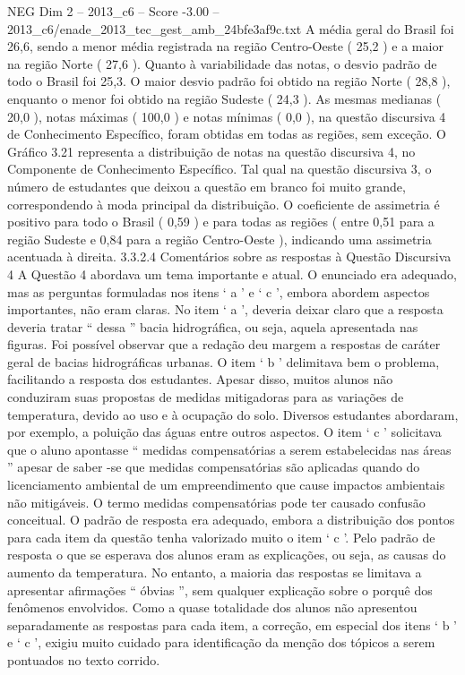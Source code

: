 \begin{textsample}{NEG Dim 2 – 2013\_c6 – Score -3.00 – 2013\_c6/enade\_2013\_tec\_gest\_amb\_24bfe3af9c.txt}
A média geral do Brasil foi 26,6, sendo a menor média registrada na região Centro-Oeste ( 25,2 ) e a maior na região Norte ( 27,6 ).
Quanto à variabilidade das notas, o desvio padrão de todo o Brasil foi 25,3.
O maior desvio padrão foi obtido na região Norte ( 28,8 ), enquanto o menor foi obtido na região Sudeste ( 24,3 ).
As mesmas medianas ( 20,0 ), notas máximas ( 100,0 ) e notas mínimas ( 0,0 ), na questão discursiva 4 de Conhecimento Específico, foram obtidas em todas as regiões, sem exceção.
O Gráfico 3.21 representa a distribuição de notas na questão discursiva 4, no Componente de Conhecimento Específico.
Tal qual na questão discursiva 3, o número de estudantes que deixou a questão em branco foi muito grande, correspondendo à moda principal da distribuição.
O coeficiente de assimetria é positivo para todo o Brasil ( 0,59 ) e para todas as regiões ( entre 0,51 para a região Sudeste e 0,84 para a região Centro-Oeste ), indicando uma assimetria acentuada à direita. 3.3.2.4 Comentários sobre as respostas à Questão Discursiva 4 A Questão 4 abordava um tema importante e atual.
O enunciado era adequado, mas as perguntas formuladas nos itens ‘ a ’ e ‘ c ’, embora abordem aspectos importantes, não eram claras.
No item ‘ a ’, deveria deixar claro que a resposta deveria tratar “ dessa ” bacia hidrográfica, ou seja, aquela apresentada nas figuras.
Foi possível observar que a redação deu margem a respostas de caráter geral de bacias hidrográficas urbanas.
O item ‘ b ’ delimitava bem o problema, facilitando a resposta dos estudantes.
Apesar disso, muitos alunos não conduziram suas propostas de medidas mitigadoras para as variações de temperatura, devido ao uso e à ocupação do solo.
Diversos estudantes abordaram, por exemplo, a poluição das águas entre outros aspectos.
O item ‘ c ’ solicitava que o aluno apontasse “ medidas compensatórias a serem estabelecidas nas áreas ” apesar de saber -se que medidas compensatórias são aplicadas quando do licenciamento ambiental de um empreendimento que cause impactos ambientais não mitigáveis.
O termo medidas compensatórias pode ter causado confusão conceitual.
O padrão de resposta era adequado, embora a distribuição dos pontos para cada item da questão tenha valorizado muito o item ‘ c ’.
Pelo padrão de resposta o que se esperava dos alunos eram as explicações, ou seja, as causas do aumento da temperatura.
No entanto, a maioria das respostas se limitava a apresentar afirmações “ óbvias ”, sem qualquer explicação sobre o porquê dos fenômenos envolvidos.
Como a quase totalidade dos alunos não apresentou separadamente as respostas para cada item, a correção, em especial dos itens ‘ b ’ e ‘ c ’, exigiu muito cuidado para identificação da menção dos tópicos a serem pontuados no texto corrido.

\end{textsample}
